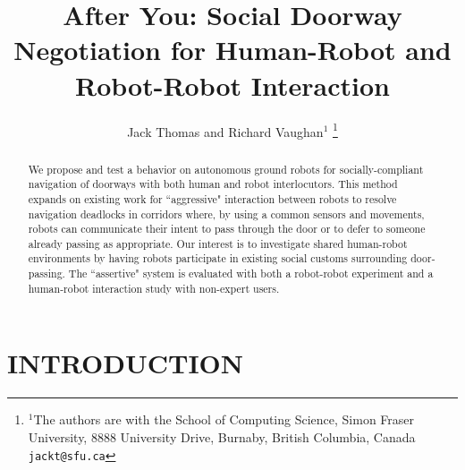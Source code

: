 \documentclass[letterpaper, 10 pt, conference]{ieeeconf}  %
\title{\LARGE \bf
After You: Social Doorway Negotiation for Human-Robot and Robot-Robot Interaction
}
\author{Jack Thomas and Richard Vaughan$^{1}$%
\thanks{$^{1}$The authors are with the School of Computing Science, Simon Fraser University, 8888 University Drive, Burnaby, British Columbia, Canada
        {\tt\small jackt@sfu.ca}}%
}
\begin{document}
\maketitle
\thispagestyle{empty}
\pagestyle{empty}


\begin{abstract}

We propose and test a behavior on autonomous ground robots for socially-compliant navigation of doorways with both human and robot interlocutors. This method expands on existing work for ``aggressive" interaction between robots to resolve navigation deadlocks in corridors where, by using a common sensors and movements, robots can communicate their intent to pass through the door or to defer to someone already passing as appropriate. Our interest is to investigate shared human-robot environments by having robots participate in existing social customs surrounding door-passing. The ``assertive" system is evaluated with both a robot-robot experiment and a human-robot interaction study with non-expert users.

\end{abstract}


\section{INTRODUCTION}


\end{document}
